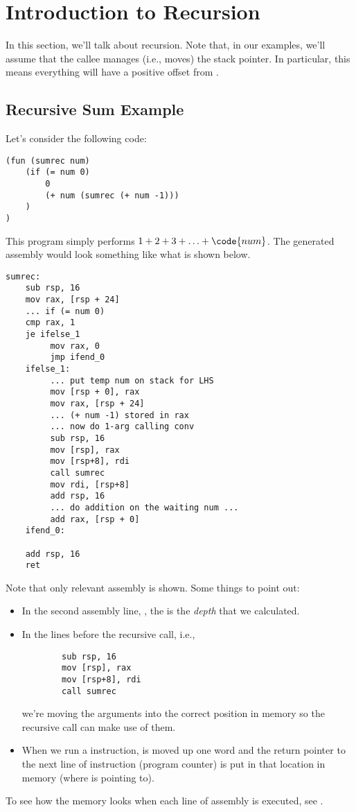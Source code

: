 \section{Introduction to Recursion}
In this section, we'll talk about recursion. Note that, in our examples, we'll assume that the callee manages (i.e., moves) the stack pointer. In particular, this means everything will have a positive offset from .

\subsection{Recursive Sum Example}
Let's consider the following code:
\begin{verbatim}
(fun (sumrec num)
    (if (= num 0)
        0
        (+ num (sumrec (+ num -1)))
    )
)\end{verbatim}
This program simply performs $1 + 2 + 3 + \hdots + \code{num}$. The generated assembly would look something like what is shown below. 
\begin{verbatim}
sumrec:
    sub rsp, 16
    mov rax, [rsp + 24]
    ... if (= num 0)
    cmp rax, 1
    je ifelse_1
         mov rax, 0
         jmp ifend_0
    ifelse_1:
         ... put temp num on stack for LHS
         mov [rsp + 0], rax
         mov rax, [rsp + 24]
         ... (+ num -1) stored in rax
         ... now do 1-arg calling conv
         sub rsp, 16
         mov [rsp], rax
         mov [rsp+8], rdi
         call sumrec
         mov rdi, [rsp+8]
         add rsp, 16
         ... do addition on the waiting num ...
         add rax, [rsp + 0]
    ifend_0:
    
    add rsp, 16
    ret\end{verbatim}
Note that only relevant assembly is shown. Some things to point out: 
\begin{itemize}
    \item In the second assembly line, , the  is the \emph{depth} that we calculated. 
    \item In the lines before the recursive call, i.e., 
    \begin{verbatim}
        sub rsp, 16
        mov [rsp], rax
        mov [rsp+8], rdi
        call sumrec\end{verbatim}
    we're moving the arguments into the correct position in memory so the recursive call can make use of them. 
    \item When we run a  instruction,  is moved up one word and the return pointer to the next line of instruction (program counter) is put in that location in memory (where  is pointing to). 
\end{itemize}
To see how the memory looks when each line of assembly is executed, see .




